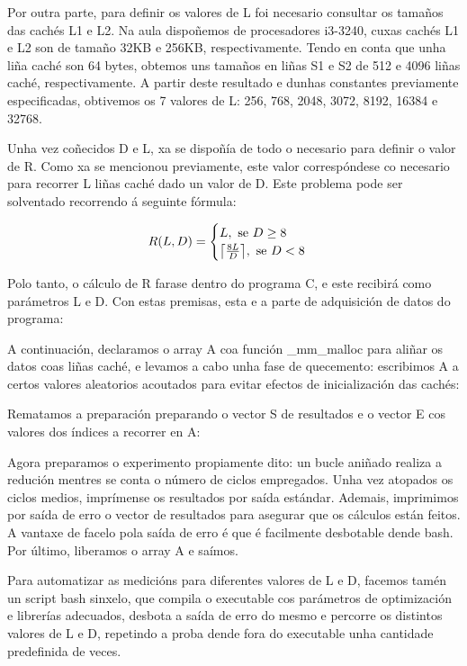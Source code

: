 \documentclass[letterpaper, 10 pt,spanish, conference]{ieeeconf}  %
\DeclarePairedDelimiter{\ceil}{\lceil}{\rceil}
\begin{document}
    Por outra parte, para definir os valores de L foi necesario consultar os tamaños das cachés L1 e L2. Na aula dispoñemos de procesadores i3-3240\cite{c1}, cuxas cachés L1 e L2 son de tamaño 32KB e 256KB, respectivamente. Tendo en conta que unha liña caché son 64 bytes, obtemos uns tamaños en liñas S1 e S2 de 512 e 4096 liñas caché, respectivamente. A partir deste resultado e dunhas constantes previamente especificadas, obtivemos os 7 valores de L: 256, 768, 2048, 3072, 8192, 16384 e 32768.
    
    Unha vez coñecidos D e L, xa se dispoñía de todo o necesario para definir o valor de R. Como xa se mencionou previamente, este valor correspóndese co necesario para recorrer L liñas caché dado un valor de D. Este problema pode ser solventado recorrendo á seguinte fórmula:
    
    \[ R(L,D)=\begin{cases}
	 L,  \text{ se } D\geq8\\ 
	 \ceil[\big]{\frac{8L}{D}},  \text{ se } D<8 
	\end{cases}\]
    
    Polo tanto, o cálculo de R farase dentro do programa C, e este recibirá como parámetros L e D. Con estas premisas, esta e a parte de adquisición de datos do programa:
    
    A continuación, declaramos o array A coa función \_mm\_malloc para aliñar os datos coas liñas caché, e levamos a cabo unha fase de quecemento: escribimos A a certos valores aleatorios acoutados para evitar efectos de inicialización das cachés:
    
    Rematamos a preparación preparando o vector S de resultados e o vector E cos valores dos índices a recorrer en A:
    
    Agora preparamos o experimento propiamente dito: un bucle aniñado realiza a redución mentres se conta o número de ciclos empregados. Unha vez atopados os ciclos medios, imprímense os resultados por saída estándar. Ademais, imprimimos por saída de erro o vector de resultados para asegurar que os cálculos están feitos. A vantaxe de facelo pola saída de erro é que é facilmente desbotable dende bash.
    Por último, liberamos o array A e saímos.
    
    Para automatizar as medicións para diferentes valores de L e D, facemos tamén un script bash sinxelo, que compila o executable cos parámetros de optimización e librerías adecuados, desbota a saída de erro do mesmo e percorre os distintos valores de L e D, repetindo a proba dende fora do executable unha cantidade predefinida de veces. 
    
\end{document}
